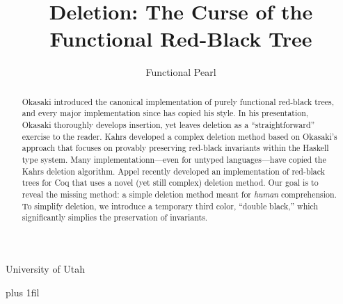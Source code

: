 \documentclass[preprint]{sigplanconf}
\begin{document}
\copyrightdata{[to be supplied]} 


\title{Deletion: The Curse of the Functional Red-Black Tree}
\subtitle{Functional Pearl}

           {University of Utah}
           
\maketitle

\rightcodeskip=0pt plus 1fil 

\begin{abstract}
Okasaki introduced the canonical implementation of purely functional red-black trees, and every major implementation since has copied his style.
In his presentation, Okasaki thoroughly develops insertion, yet leaves deletion as a ``straightforward'' exercise to the reader.
Kahrs developed a complex deletion method based on Okasaki's approach that focuses on provably preserving red-black invariants within the Haskell type system.
Many implementationn---even for untyped languages---have copied the Kahrs deletion algorithm.
Appel recently developed an implementation of red-black trees for Coq that uses a novel (yet still complex) deletion method.
Our goal is to reveal the missing method: a simple deletion method meant for \emph{human} comprehension.
To simplify deletion, we introduce a temporary third color, ``double black,'' which significantly simplies the preservation of invariants.
\end{abstract}

\end{document}
